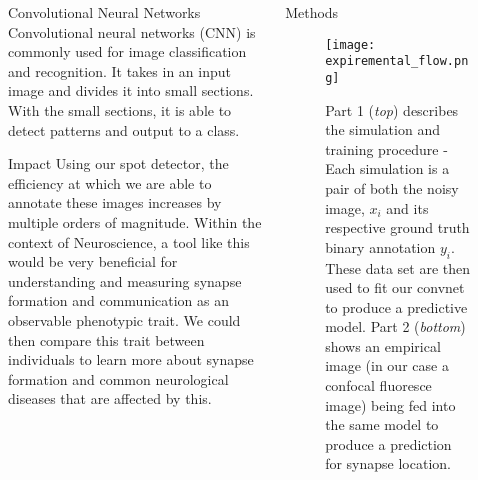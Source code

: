 \documentclass[final]{beamer}
\newlength{\onecolwid}
\begin{document}
\begin{frame}[t]
\begin{columns}[t]
\begin{column}{\onecolwid}
\begin{alertblock}{Convolutional Neural Networks}
Convolutional neural networks (CNN) is commonly used for image classification and recognition. It takes in an input image and divides it into small sections. With the small sections, it is able to detect patterns and output to a class.
\end{alertblock}

\begin{block}{Impact}
 Using our spot detector, the efficiency at which we are able to annotate these images increases by multiple orders of magnitude. Within the context of Neuroscience, a tool like this would be very beneficial for understanding and measuring synapse formation and communication as an observable phenotypic trait. We could then compare this trait between individuals to learn more about synapse formation and common neurological diseases that are affected by this.
\end{block}

% 


\end{column}

\begin{column}{\onecolwid}
\begin{block}{Methods}
    \begin{figure}
        \texttt{[image: expiremental\_flow.png]}
        \setlength{\belowcaptionskip}{-20pt}
        \caption{
        Part 1 (\textit{top}) describes the simulation and training procedure 
        - Each simulation is a pair of both the noisy image, $x_{i}$ and its respective ground truth binary annotation $y_{i}$. These data set are then used to fit our convnet to produce a predictive model. Part 2 (\textit{bottom}) shows an empirical image (in our case a confocal fluoresce image) being fed into the same model to produce a prediction for synapse location.}
    \end{figure}
\end{block}


\end{column}
\end{columns}
\end{frame}
\end{document}
